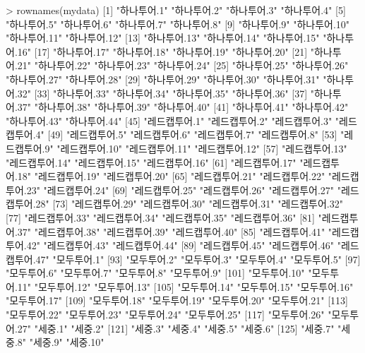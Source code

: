 \begin{Schunk}
\begin{Soutput}
> rownames(mydata)
  [1] "하나투어.1"      "하나투어.2"      "하나투어.3"      "하나투어.4"     
  [5] "하나투어.5"      "하나투어.6"      "하나투어.7"      "하나투어.8"     
  [9] "하나투어.9"      "하나투어.10"     "하나투어.11"     "하나투어.12"    
 [13] "하나투어.13"     "하나투어.14"     "하나투어.15"     "하나투어.16"    
 [17] "하나투어.17"     "하나투어.18"     "하나투어.19"     "하나투어.20"    
 [21] "하나투어.21"     "하나투어.22"     "하나투어.23"     "하나투어.24"    
 [25] "하나투어.25"     "하나투어.26"     "하나투어.27"     "하나투어.28"    
 [29] "하나투어.29"     "하나투어.30"     "하나투어.31"     "하나투어.32"    
 [33] "하나투어.33"     "하나투어.34"     "하나투어.35"     "하나투어.36"    
 [37] "하나투어.37"     "하나투어.38"     "하나투어.39"     "하나투어.40"    
 [41] "하나투어.41"     "하나투어.42"     "하나투어.43"     "하나투어.44"    
 [45] "레드캡투어.1"    "레드캡투어.2"    "레드캡투어.3"    "레드캡투어.4"   
 [49] "레드캡투어.5"    "레드캡투어.6"    "레드캡투어.7"    "레드캡투어.8"   
 [53] "레드캡투어.9"    "레드캡투어.10"   "레드캡투어.11"   "레드캡투어.12"  
 [57] "레드캡투어.13"   "레드캡투어.14"   "레드캡투어.15"   "레드캡투어.16"  
 [61] "레드캡투어.17"   "레드캡투어.18"   "레드캡투어.19"   "레드캡투어.20"  
 [65] "레드캡투어.21"   "레드캡투어.22"   "레드캡투어.23"   "레드캡투어.24"  
 [69] "레드캡투어.25"   "레드캡투어.26"   "레드캡투어.27"   "레드캡투어.28"  
 [73] "레드캡투어.29"   "레드캡투어.30"   "레드캡투어.31"   "레드캡투어.32"  
 [77] "레드캡투어.33"   "레드캡투어.34"   "레드캡투어.35"   "레드캡투어.36"  
 [81] "레드캡투어.37"   "레드캡투어.38"   "레드캡투어.39"   "레드캡투어.40"  
 [85] "레드캡투어.41"   "레드캡투어.42"   "레드캡투어.43"   "레드캡투어.44"  
 [89] "레드캡투어.45"   "레드캡투어.46"   "레드캡투어.47"   "모두투어.1"     
 [93] "모두투어.2"      "모두투어.3"      "모두투어.4"      "모두투어.5"     
 [97] "모두투어.6"      "모두투어.7"      "모두투어.8"      "모두투어.9"     
[101] "모두투어.10"     "모두투어.11"     "모두투어.12"     "모두투어.13"    
[105] "모두투어.14"     "모두투어.15"     "모두투어.16"     "모두투어.17"    
[109] "모두투어.18"     "모두투어.19"     "모두투어.20"     "모두투어.21"    
[113] "모두투어.22"     "모두투어.23"     "모두투어.24"     "모두투어.25"    
[117] "모두투어.26"     "모두투어.27"     "세중.1"          "세중.2"         
[121] "세중.3"          "세중.4"          "세중.5"          "세중.6"         
[125] "세중.7"          "세중.8"          "세중.9"          "세중.10"        

\end{Soutput}
\end{Schunk}
